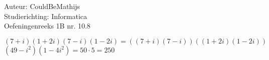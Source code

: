 \documentclass[a4paper]{article}
\begin{document}
  
\noindent \large Auteur: CouldBeMathijs \\
\noindent \large Studierichting: Informatica\\
\noindent \large Oefeningenreeks 1B nr. 10.8\\

\medskip

\normalsize

$(7+i)(1+2i)(7-i)(1-2i) = ((7+i)(7-i))((1+2i)(1-2i))$ \\

$(49-i^2)(1-4i^2) = 50 \cdot 5 = 250$


\begin{thebibliography}{999}
\end{thebibliography}
\end{document}
